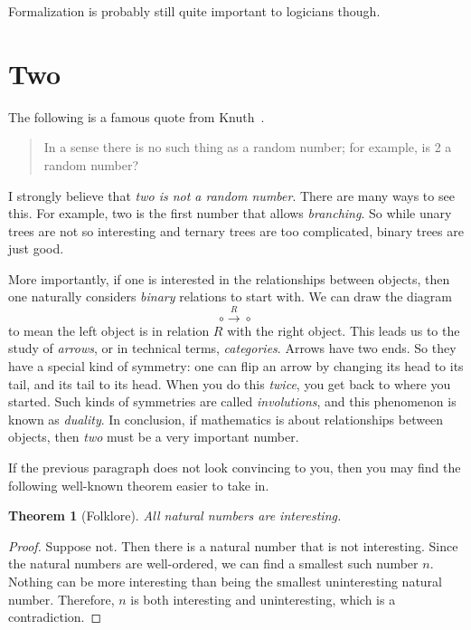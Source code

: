 \documentclass{bhamthesis}
\newtheorem*{thm}{Theorem}
\theoremstyle{definition}
\begin{document}
Formalization is probably still quite important to logicians
though.


\appendix
\chapter*{Two}
The following is a famous quote from
Knuth~\cite[Section~3.1]{book:ArtProgram}.
\begin{quotation}
 In a sense there is no such thing as a random number; for
 example, is 2 a random number?
\end{quotation}
I strongly believe that \emph{two is not a random number}.  There
are many ways to see this.  For example, two is the first number
that allows \emph{branching}.  So while unary trees are not so
interesting and ternary trees are too complicated, binary trees
are just good.

More importantly, if one is interested in the relationships
between objects, then one naturally considers \emph{binary}
relations to start with.  We can draw the diagram
\[ {\circ} \stackrel{R}{\longrightarrow} {\circ} \]
to mean the left object is in relation $R$ with the right object.
This leads us to the study of \emph{arrows}, or in technical
terms, \emph{categories}.  Arrows have two ends.  So they have a
special kind of symmetry: one can flip an arrow by changing its
head to its tail, and its tail to its head.  When you do this
\emph{twice}, you get back to where you started.  Such kinds of
symmetries are called \emph{involutions}, and this phenomenon is
known as \emph{duality}.  In conclusion, if mathematics is about
relationships between objects, then \emph{two} must be a very
important number.

If the previous paragraph does not look convincing to you, then
you may find the following well-known theorem easier to take in.

\begin{thm}[Folklore]
 All natural numbers are interesting.
\end{thm}

\begin{proof}
 Suppose not.  Then there is a natural number that is not
 interesting.  Since the natural numbers are well-ordered, we can
 find a smallest such number $n$.  Nothing can be more interesting
 than being the smallest uninteresting natural number.  Therefore,
 $n$ is both interesting and uninteresting, which is a
 contradiction.
\end{proof}


\backmatter


\end{document}
